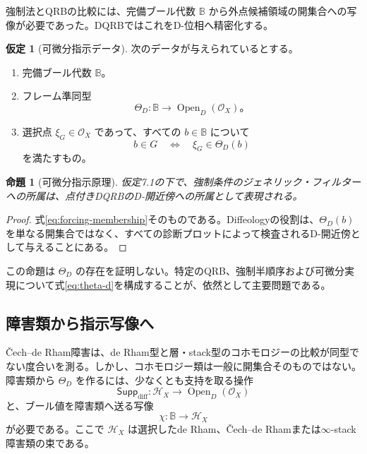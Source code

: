 \documentclass[a4paper,11pt]{ltjsarticle}
\theoremstyle{definition}
\newtheorem{assumption}[definition]{仮定}
\theoremstyle{plain}
\newtheorem{proposition}[definition]{命題}
\newcommand{\OpenD}{\operatorname{Open}_{D}}
\newcommand{\Bool}{\mathbb B}
\begin{document}
強制法とQRBの比較には、完備ブール代数 $\Bool$ から外点候補領域の開集合への写像が必要であった。DQRBではこれをD-位相へ精密化する。

\begin{assumption}[可微分指示データ]
次のデータが与えられているとする。
\begin{enumerate}
 \item 完備ブール代数 $\Bool$。
 \item フレーム準同型
 \begin{equation}
  \Theta_D:\Bool\longrightarrow\OpenD(\mathcal O_X)。
  \label{eq:theta-d}
 \end{equation}
 \item 選択点 $\xi_G\in\mathcal O_X$ であって、すべての $b\in\Bool$ について
 \begin{equation}
  b\in G
  \quad\Longleftrightarrow\quad
  \xi_G\in\Theta_D(b)
  \label{eq:forcing-membership}
 \end{equation}
 を満たすもの。
\end{enumerate}
\end{assumption}

\begin{proposition}[可微分指示原理]
仮定7.1の下で、強制条件のジェネリック・フィルターへの所属は、点付きDQRBのD-開近傍への所属として表現される。
\end{proposition}

\begin{proof}
式\eqref{eq:forcing-membership}そのものである。Diffeologyの役割は、$\Theta_D(b)$ を単なる開集合ではなく、すべての診断プロットによって検査されるD-開近傍として与えることにある。
\end{proof}

この命題は $\Theta_D$ の存在を証明しない。特定のQRB、強制半順序および可微分実現について式\eqref{eq:theta-d}を構成することが、依然として主要問題である。

\subsection{障害類から指示写像へ}

\v{C}ech--de Rham障害は、de Rham型と層・stack型のコホモロジーの比較が同型でない度合いを測る\cite{Minichiello2024Obstruction}。しかし、コホモロジー類は一般に開集合そのものではない。障害類から $\Theta_D$ を作るには、少なくとも支持を取る操作
\begin{equation}
 \mathsf{Supp}_{\mathrm{diff}}:
 \mathcal H_X\longrightarrow\OpenD(\mathcal O_X)
 \label{eq:diff-support}
\end{equation}
と、ブール値を障害類へ送る写像
\begin{equation}
 \chi:\Bool\longrightarrow\mathcal H_X
 \label{eq:characteristic-obstruction}
\end{equation}
が必要である。ここで $\mathcal H_X$ は選択したde Rham、\v{C}ech--de Rhamまたは$\infty$-stack障害類の束である。
\end{document}

